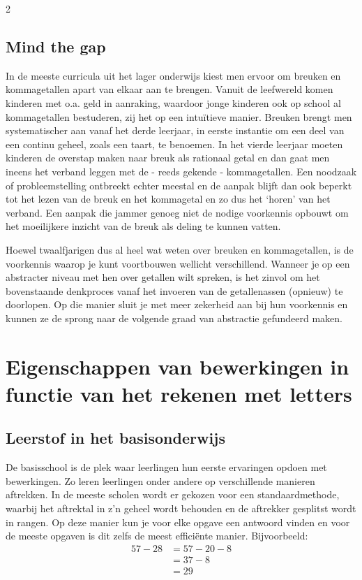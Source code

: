\begin{multicols}{2}
\subsection{Mind the gap}

In de meeste curricula uit het lager onderwijs kiest men ervoor om breuken en kommagetallen apart van elkaar aan te brengen.
Vanuit de leefwereld komen kinderen met o.a. geld in aanraking, waardoor jonge kinderen ook op school al kommagetallen bestuderen, zij het op een intuïtieve manier.
Breuken brengt men systematischer aan vanaf het derde leerjaar, in eerste instantie om een deel van een continu geheel, zoals een taart, te benoemen.
In het vierde leerjaar moeten kinderen de overstap maken naar breuk als rationaal getal en dan gaat men ineens het verband leggen met de - reeds gekende - kommagetallen.
Een noodzaak of probleemstelling ontbreekt echter meestal en de aanpak blijft dan ook beperkt tot het lezen van de breuk en het kommagetal en zo dus het `horen' van het verband.
Een aanpak die jammer genoeg niet de nodige voorkennis opbouwt om het moeilijkere inzicht van de breuk als deling te kunnen vatten.

Hoewel twaalfjarigen dus al heel wat weten over breuken en kommagetallen, is de voorkennis waarop je kunt voortbouwen wellicht verschillend.
Wanneer je op een abstracter niveau met hen over getallen wilt spreken, is het zinvol om het bovenstaande denkproces vanaf het invoeren van de getallenassen (opnieuw) te doorlopen.
Op die manier sluit je met meer zekerheid aan bij hun voorkennis en kunnen ze de sprong naar de volgende graad van abstractie gefundeerd maken.

\section{Eigenschappen van bewerkingen in functie van het rekenen met letters}\label{bewerk} %

\subsection{Leerstof in het basisonderwijs}
De basisschool is de plek waar leerlingen hun eerste ervaringen opdoen met bewerkingen.
Zo leren leerlingen onder andere op verschillende manieren aftrekken.
In de meeste scholen wordt er gekozen voor een standaardmethode, waarbij het aftrektal in z'n geheel wordt behouden en de aftrekker gesplitst wordt in rangen.
Op deze manier kun je voor elke opgave een antwoord vinden en voor de meeste opgaven is dit zelfs de meest efficiënte manier.
Bijvoorbeeld:
\begin{align*}
    57-28 &= 57-20-8\\
    &= 37-8\\
    &= 29
\end{align*}


\end{multicols}
